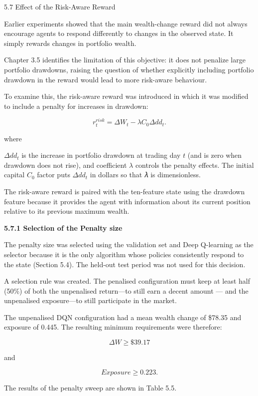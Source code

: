 5.7 Effect of the Risk-Aware Reward

Earlier experiments showed that the main wealth-change reward did not
always encourage agents to respond differently to changes in the
observed state. It simply rewards changes in portfolio wealth.

Chapter 3.5 identifies the limitation of this objective: it does not
penalize large portfolio drawdowns, raising the question of whether
explicitly including portfolio drawdown in the reward would lead to more
risk-aware behaviour.

To examine this, the risk-aware reward was introduced in which it was
modified to include a penalty for increases in drawdown:

\[r_{t}^{risk} = \Delta W_{t} - \lambda C_{0}\Delta dd_{t}.\]

where

\(\Delta dd_{t}\) is the increase in portfolio drawdown at trading day
\(t\) (and is zero when drawdown does not rise), and coefficient
\(\lambda\) controls the penalty effects. The initial capital \(C_{0}\)
factor puts \(\Delta dd_{t}\) in dollars so that 𝜆 is dimensionless.

The risk-aware reward is paired with the ten-feature state using the
drawdown feature because it provides the agent with information about
its current position relative to its previous maximum wealth.

\textbf{5.7.1 Selection of the Penalty size}

The penalty size was selected using the validation set and Deep
Q-learning as the selector because it is the only algorithm whose
policies consistently respond to the state (Section 5.4). The held-out
test period was not used for this decision.

A selection rule was created. The penalised configuration must keep at
least half (50\%) of both the unpenalised return---to still earn a
decent amount --- and the unpenalised exposure---to still participate in
the market.

The unpenalised DQN configuration had a mean wealth change of \$78.35
and exposure of 0.445. The resulting minimum requirements were
therefore:

\[\Delta W \geq \$ 39.17\]

and

\[Exposure \geq 0.223.\]

The results of the penalty sweep are shown in Table 5.5.

